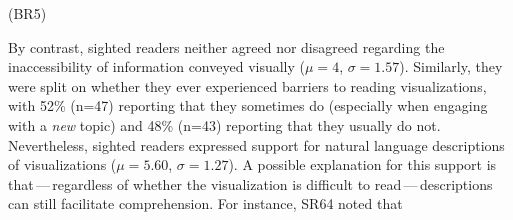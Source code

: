 \begin{displayquote}
    \vspace{-1mm}
    (BR5)
    \vspace{-1mm}
\end{displayquote}

\noindent
By contrast, sighted readers neither agreed nor disagreed regarding the inaccessibility of information conveyed visually ($\mu=4$, $\sigma=1.57$).
Similarly, they were split on whether they ever experienced barriers to reading visualizations, with {52}\% (n={47}) reporting that they sometimes do (especially when engaging with a \emph{new} topic) and {48}\% (n={43}) reporting that they usually do not.
Nevertheless, sighted readers expressed support for natural language descriptions of visualizations ($\mu=5.60$, $\sigma=1.27$).
A possible explanation for this support is that\,---\,regardless of whether the visualization is difficult to read\,---\,descriptions can still facilitate comprehension. For instance, SR64 noted that 


